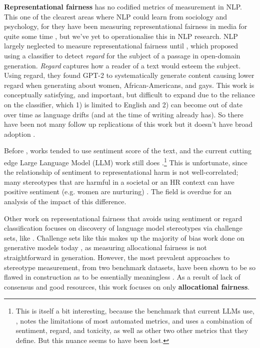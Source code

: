 \textbf{Representational fairness} has no codified metrics of measurement in NLP. This one of the clearest areas where NLP could learn from sociology and psychology, for they have been measuring representational fairness in media for quite some time \citep{dixon2017dangerous, black_rep_bias}, but we've yet to operationalise this in NLP research. NLP largely neglected to measure representational fairness until \citet{sheng-etal-2019-woman}, which proposed using a classifier to detect \textit{regard} for the subject of a passage in open-domain generation. \textit{Regard} captures how a reader of a text would esteem the subject. Using regard, they found GPT-2 \citep{radford2019language} to systematically generate content causing lower regard when generating about women, African-Americans, and gays. This work is conceptually satisfying, and important, but difficult to expand due to the reliance on the classifier, which 1) is limited to English and 2) can become out of date over time as language drifts (and at the time of writing already has). So there have been not many follow up replications of this work but it doesn't have broad adoption \citep{goldfarb-tarrant-etal-2023-prompt}.

Before \citet{sheng-etal-2019-woman}, works tended to use sentiment score of the text, and the current cutting edge Large Language Model (LLM) work still does \cite{llama2, jiang2024mixtral}.\footnote{This is itself a bit interesting, because the benchmark that current LLMs use, \citet{Dhamala_2021}, notes the limitations of most automated metrics, and uses a combination of sentiment, regard, and toxicity, as well as other two other metrics that they define. But this nuance seems to have been lost.} This is unfortunate, since the relationship of sentiment to representational harm is not well-correlated; many stereotypes that are harmful in a societal or an HR context can have positive sentiment (e.g. women are nurturing) \citep{fraser-etal-2021-understanding}. The field is overdue for an analysis of the impact of this difference.



 Other work on representational fairness that avoids using sentiment or regard classification focuses on discovery of language model stereotypes via challenge sets, like . Challenge sets like this makes up the majority of bias work done on generative models today \citep{goldfarb-tarrant-etal-2023-prompt}, as measuring allocational fairness is not straightforward in generation. However, the most prevalent approaches to stereotype measurement, from two benchmark datasets, have been shown to be so flawed in construction as to be essentially meaningless \citep{blodgett-etal-2021-stereotyping}. As a result of lack of consensus and good resources, this work focuses on only \textbf{allocational fairness}.

